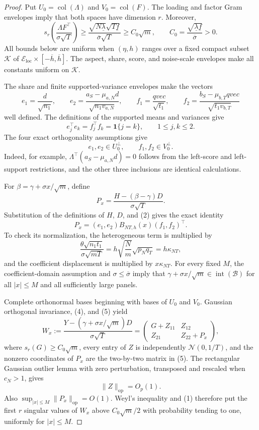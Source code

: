 \documentclass{article}
\begin{document}
\begin{proof}
Put \(U_0=\operatorname{col}(\Lambda)\) and \(V_0=\operatorname{col}(F)\).  The loading and factor Gram envelopes imply that both spaces have dimension \(r\).  Moreover,
\[
 s_r\!\left(\frac{\Lambda F^{\top}}{\sigma\sqrt T}\right)
 \geq
 \frac{\sqrt{N\underline\lambda}\sqrt{T\underline f}}
 {\overline\sigma\sqrt T}
 \geq C_0\sqrt m,
 \qquad C_0=\frac{\sqrt{\underline\lambda\underline f}}{\overline\sigma}>0. \tag{1}
\]
All bounds below are uniform when \((\eta,h)\) ranges over a fixed compact subset \(\mathcal K\) of \(\mathcal E_{\mathrm{loc}}\times[-\overline h,\overline h]\).  The aspect, share, score, and noise-scale envelopes make all constants uniform on \(\mathcal K\).

The share and finite supported-variance envelopes make the vectors
\[
 e_1=\frac d{\sqrt{n_1}},\qquad
 e_2=\frac{a_S-\mu_{a,N}d}{\sqrt{n_1v_{a,N}}},\qquad
 f_1=\frac{qvec}{\sqrt{t_1}},\qquad
 f_2=\frac{b_S-\mu_{b,T}qvec}{\sqrt{t_1v_{b,T}}} \tag{2}
\]
well defined.  The definitions of the supported means and variances give
\[
 e_j^{\top}e_k=f_j^{\top}f_k=\mathbf 1\{j=k\},\qquad 1\leq j,k\leq2. \tag{3}
\]
The four exact orthogonality assumptions give
\[
 e_1,e_2\in U_0^{\perp},\qquad f_1,f_2\in V_0^{\perp}. \tag{4}
\]
Indeed, for example,
\(\Lambda^{\top}(a_S-\mu_{a,N}d)=0\) follows from the left-score and left-support restrictions, and the other three inclusions are identical calculations.

For \(\beta=\gamma+\sigma x/\sqrt m\), define
\[
 P_x=\frac{H-(\beta-\gamma)D}{\sigma\sqrt T}.
\]
Substitution of the definitions of \(H\), \(D\), and (2) gives the exact identity
\[
 P_x=(e_1,e_2)B_{NT,h}(x)(f_1,f_2)^{\top}. \tag{5}
\]
To check its normalization, the heterogeneous term is multiplied by
\[
 \frac{\theta\sqrt{n_1t_1}}{\sigma\sqrt{mT}}
 =h\sqrt{\frac Nm}\sqrt{p_Nq_T}=h\kappa_{NT}, \tag{6}
\]
and the coefficient displacement is multiplied by \(x\kappa_{NT}\).  For every fixed \(M\), the coefficient-domain assumption and \(\sigma\leq\overline\sigma\) imply that \(\gamma+\sigma x/\sqrt m\in\operatorname{int}(\mathcal B)\) for all \(|x|\leq M\) and all sufficiently large panels.

Complete orthonormal bases beginning with bases of \(U_0\) and \(V_0\).  Gaussian orthogonal invariance, (4), and (5) yield
\[
 W_x:=\frac{Y-(\gamma+\sigma x/\sqrt m)D}{\sigma\sqrt T}
 =
 \begin{pmatrix}
 G+Z_{11}&Z_{12}\\
 Z_{21}&Z_{22}+P_x
 \end{pmatrix}, \tag{7}
\]
where \(s_r(G)\geq C_0\sqrt m\), every entry of \(Z\) is independently \(\mathcal N(0,1/T)\), and the nonzero coordinates of \(P_x\) are the two-by-two matrix in (5).  The rectangular Gaussian outlier lemma with zero perturbation, transposed and rescaled when \(c_N>1\), gives
\[
 \|Z\|_{\mathrm{op}}=O_p(1). \tag{8}
\]
Also \(\sup_{|x|\leq M}\|P_x\|_{\mathrm{op}}=O(1)\).  Weyl's inequality and (1) therefore put the first \(r\) singular values of \(W_x\) above \(C_0\sqrt m/2\) with probability tending to one, uniformly for \(|x|\leq M\).


\end{proof}
\end{document}

